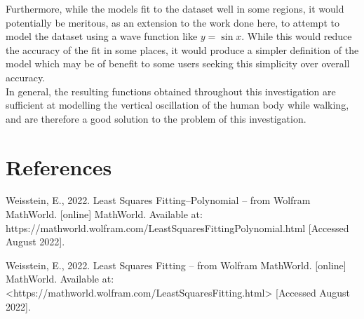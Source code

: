 \documentclass[12pt, a4paper]{article}
\begin{document}
Furthermore, while the models fit to the dataset well in some regions, it would
potentially be meritous, as an extension to the work done here, to attempt to
model the dataset using a wave function like $y=\sin x$. While this would reduce
the accuracy of the fit in some places, it would produce a simpler definition of
the model which may be of benefit to some users seeking this simplicity over
overall accuracy. \\

In general, the resulting functions obtained throughout this investigation are
sufficient at modelling the vertical oscillation of the human body while
walking, and are therefore a good solution to the problem of this investigation.

\section{References}
Weisstein, E., 2022. Least Squares Fitting--Polynomial -- from Wolfram
MathWorld. [online] MathWorld. Available at:
https://mathworld.wolfram.com/LeastSquaresFittingPolynomial.html [Accessed
August 2022].

Weisstein, E., 2022. Least Squares Fitting -- from Wolfram MathWorld. [online]
MathWorld. Available at:
<https://mathworld.wolfram.com/LeastSquaresFitting.html> [Accessed August 2022].
\end{document}
